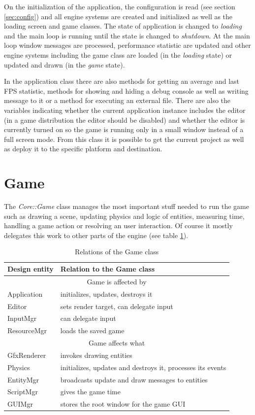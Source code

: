 \documentclass[a4paper, 12pt]{report}
\begin{document}
On the initialization of the application, the configuration is read (see section \ref{sec:config}) and all engine systems are created and initialized as well as the loading screen and game classes. The state of application is changed to \emph{loading} and the main loop is running until the state is changed to \emph{shutdown}. At the main loop window messages are processed, performance statistic are updated and other engine systems including the game class are loaded (in the \emph{loading} state) or updated and drawn (in the \emph{game} state).

In the application class there are also methods for getting an average and last FPS statistic, methods for showing and hiding a debug console as well as writing message to it or a method for executing an external file. There are also the variables indicating whether the current application instance includes the editor (in a game distribution the editor should be disabled) and whether the editor is currently turned on so the game is running only in a small window instead of a full screen mode. From this class it is possible to get the current project as well as deploy it to the specific platform and destination.

\section{Game}

The \emph{Core::Game} class manages the most important stuff needed to run the game such as drawing a scene, updating physics and logic of entities, measuring time, handling a game action or resolving an user interaction. Of course it mostly delegates this work to other parts of the engine (see table \ref{tab:game-relation}).

\begin{table}[htbp]
	\centering
		\begin{tabular}{|p{0.18\hsize}|p{0.75\hsize}|}
			\hline
			Design entity & Relation to the Game class\\
			\hline
			\multicolumn{2}{|c|}{Game is affected by}\\
			\hline
			Application & initializes, updates, destroys it\\
			Editor & sets render target, can delegate input\\
			InputMgr & can delegate input\\
			ResourceMgr & loads the saved game\\
			\hline
			\multicolumn{2}{|c|}{Game affects what}\\
			\hline
			GfxRenderer & invokes drawing entities\\
			Physics & initializes, updates and destroys it, processes its events\\
			EntityMgr & broadcasts update and draw messages to entities\\
			ScriptMgr & gives the game time\\
			GUIMgr & stores the root window for the game GUI\\
			\hline
		\end{tabular}
	\caption[Relations of the Game class]{Relations of the Game class}
	\label{tab:game-relation}
\end{table}
\end{document}
